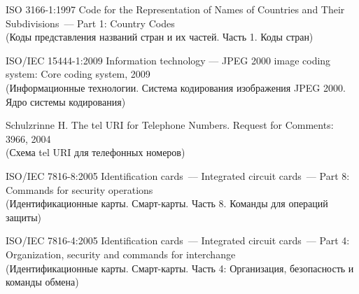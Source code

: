\clearpage
\renewcommand{\bibname}{Библиография}
\begin{thebibliography}{9}

ISO 3166-1:1997 Code for the Representation of Names of Countries and 
Their Subdivisions~--– Part 1: Country Codes\\
{\small (Коды представления названий стран и их частей. Часть 1. 
Коды стран)}

ISO/IEC 15444-1:2009 Information technology --- 
JPEG 2000 image coding system: Core coding system, 2009\\
{\small (Информационные технологии. Система кодирования изображения JPEG 
2000. Ядро системы кодирования)}

Schulzrinne H. The tel URI for Telephone Numbers. Request for Comments:  3966, 2004\\ 
{\small (Схема tel URI для телефонных номеров)}

ISO/IEC 7816-8:2005 Identification cards~--– Integrated circuit cards~--- 
Part 8: Commands for security operations\\ 
{\small (Идентификационные карты. Смарт-карты. Часть 8. Команды для 
операций защиты)}

ISO/IEC 7816-4:2005 Identification cards~--- Integrated circuit cards~--- 
Part 4: Organization, security and commands for interchange\\
{\small (Идентификационные карты. Смарт-карты. 
Часть 4: Организация, безопасность и команды обмена)}

\label{LastBib}
\end{thebibliography}



